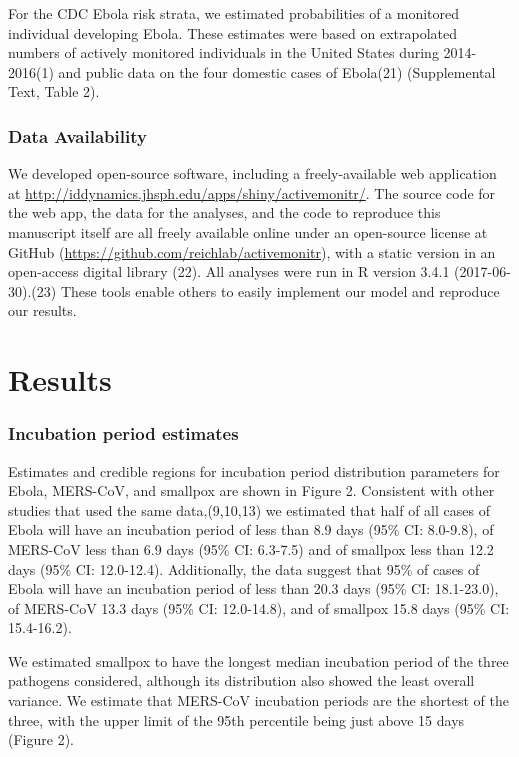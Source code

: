 \documentclass[]{article}
\begin{document}
For the CDC Ebola risk strata, we estimated probabilities of a monitored
individual developing Ebola. These estimates were based on extrapolated
numbers of actively monitored individuals in the United States during
2014-2016(1) and public data on the four domestic cases of Ebola(21)
(Supplemental Text, Table 2).

\subsubsection{Data Availability}\label{data-availability}

We developed open-source software, including a freely-available web
application at
\url{http://iddynamics.jhsph.edu/apps/shiny/activemonitr/}. The source
code for the web app, the data for the analyses, and the code to
reproduce this manuscript itself are all freely available online under
an open-source license at GitHub
(\url{https://github.com/reichlab/activemonitr}), with a static version
in an open-access digital library (22). All analyses were run in R
version 3.4.1 (2017-06-30).(23) These tools enable others to easily
implement our model and reproduce our results.

\section{Results}\label{results}

\subsubsection{Incubation period
estimates}\label{incubation-period-estimates}

Estimates and credible regions for incubation period distribution
parameters for Ebola, MERS-CoV, and smallpox are shown in Figure 2.
Consistent with other studies that used the same data,(9,10,13) we
estimated that half of all cases of Ebola will have an incubation period
of less than 8.9 days (95\% CI: 8.0-9.8), of MERS-CoV less than 6.9 days
(95\% CI: 6.3-7.5) and of smallpox less than 12.2 days (95\% CI:
12.0-12.4). Additionally, the data suggest that 95\% of cases of Ebola
will have an incubation period of less than 20.3 days (95\% CI:
18.1-23.0), of MERS-CoV 13.3 days (95\% CI: 12.0-14.8), and of smallpox
15.8 days (95\% CI: 15.4-16.2).

We estimated smallpox to have the longest median incubation period of
the three pathogens considered, although its distribution also showed
the least overall variance. We estimate that MERS-CoV incubation periods
are the shortest of the three, with the upper limit of the 95th
percentile being just above 15 days (Figure 2).
\end{document}
